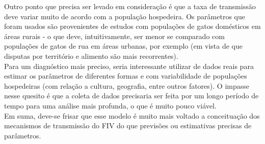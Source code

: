 \documentclass{article}
\begin{document}
\noindent Outro ponto que precisa ser levado em consideração é que a taxa de transmissão deve variar muito de acordo com a população hospedeira. Os parâmetros que foram usados são provenientes de estudos com populações de gatos domésticos em áreas rurais - o que deve, intuitivamente, ser menor se comparado com populações de gatos de rua em áreas urbanas, por exemplo (em vista de que disputas por território e alimento são mais recorrentes).\\

\noindent Para um diagnóstico mais preciso, seria interessante utilizar de dados reais para estimar os parâmetros de diferentes formas e com variabilidade de populações hospedeiras (com relação a cultura, geografia, entre outros fatores). O impasse nesse quesito é que a coleta de dados precisaria ser feita por um longo período de tempo para uma análise mais profunda, o que é muito pouco viável.\\

\noindent Em suma, deve-se frisar que esse modelo é muito mais voltado a conceituação dos mecanismos de
transmissão do FIV do que previsões ou estimativas precisas de parâmetros. 
\newpage

\end{document}
